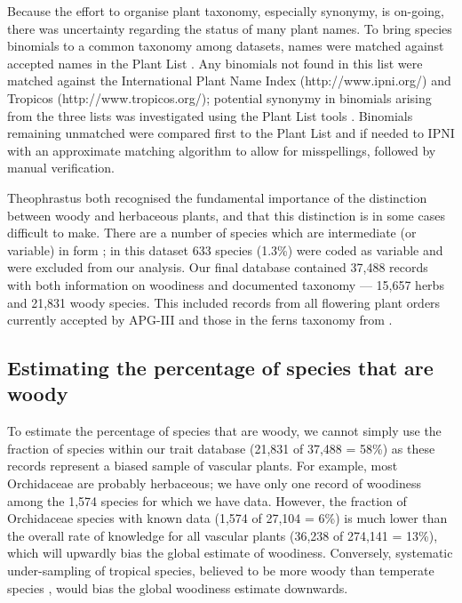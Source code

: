 \documentclass[a4paper,12pt]{article}
\begin{document}
%
Because the effort to organise plant taxonomy, especially synonymy, is
on-going, there was uncertainty regarding the status of many 
plant names.  
%
To bring species binomials to a common taxonomy among datasets, names
were matched against accepted names in the Plant List
\citep{ThePlantList}.  Any binomials not found in this list were
matched against the International Plant Name Index
(http://www.ipni.org/) and Tropicos (http://www.tropicos.org/);
potential synonymy in binomials arising from the three lists was
investigated using the Plant List tools \citep{ThePlantList}.  
%
Binomials remaining unmatched were compared first to the Plant List
and if needed to IPNI with an approximate matching algorithm to allow
for misspellings, followed by manual verification.

Theophrastus both recognised the fundamental importance of the
distinction between woody and herbaceous plants, and that this
distinction is in some cases difficult to make.  There are a number of
species which are intermediate (or variable) in form \citep{beaulieuHiddenRates}; in
this dataset 633 species (1.3\%) were coded as variable and were
excluded from our analysis.
%
Our final database contained 37,488 records with both information on
woodiness and documented taxonomy --- 15,657 herbs and 21,831 woody
species.  This included records from all flowering plant orders
currently accepted by APG-III \citep{APG3} and those in the ferns
taxonomy from \citet{apweb}.


\subsection{Estimating the percentage of species that are woody}

To estimate the percentage of species that are woody, we cannot simply
use the fraction of species within our trait database (21,831 of
37,488 = 58\%) as these records represent a biased sample of vascular
plants.
For example, most Orchidaceae are probably herbaceous; we have only
one record of woodiness among the 1,574 species for which we have
data.
However, the fraction of Orchidaceae species with known data (1,574 of
27,104 = 6\%)
is much lower than the overall rate of knowledge for all vascular
plants (36,238 of 274,141 = 13\%), which will upwardly bias the global
estimate of woodiness.
%
Conversely, systematic under-sampling of tropical species, believed to
be more woody than temperate species \citep{Molesheihgt}, would bias
the global woodiness estimate downwards.
\end{document}

